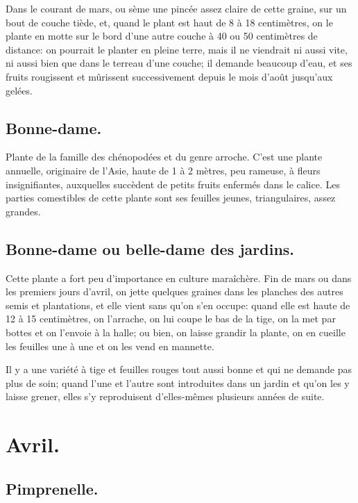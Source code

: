 \documentclass[10pt,a4paper]{book}
\begin{document}
Dans le courant de mars, ou sème une pincée assez claire de cette graine, sur un bout de couche tiède, et, quand le plant est haut de 8 à 18 centimètres, on le plante en motte sur le bord d'une autre couche à 40 ou 50 centimètres de distance: on pourrait le planter en pleine terre, mais il ne viendrait ni aussi vite, ni aussi bien que dans le terreau d'une couche; il demande beaucoup d'eau, et ses fruits rougissent et mûrissent successivement depuis le mois d'août jusqu'aux gelées.

\subsection{Bonne-dame.}

Plante de la famille des chénopodées et du genre arroche. C'est une plante annuelle, originaire de l'Asie, haute de 1 à 2 mètres, peu rameuse, à fleurs insignifiantes, auxquelles succèdent de petits fruits enfermés dans le calice. Les parties comestibles de cette plante sont ses feuilles jeunes, triangulaires, assez grandes.

\subsection{Bonne-dame ou belle-dame des jardins.}

Cette plante a fort peu d'importance en culture maraîchère. Fin de mars ou dans les premiers jours d'avril, on jette quelques graines dans les planches des autres semis et plantations, et elle vient sans qu'on s'en occupe: quand elle est haute de 12 à 15 centimètres, on l'arrache, on lui coupe le bas de la tige, on la met par bottes et on l'envoie à la halle; ou bien, on laisse grandir la plante, on en cueille les feuilles une à une et on les vend en mannette.

Il y a une variété à tige et feuilles rouges tout aussi bonne et qui ne demande pas plus de soin; quand l'une et l'autre sont introduites dans un jardin et qu'on les y laisse grener, elles s'y reproduisent d'elles-mêmes plusieurs années de suite.

\section{Avril.}

\subsection{Pimprenelle.}
\end{document}

